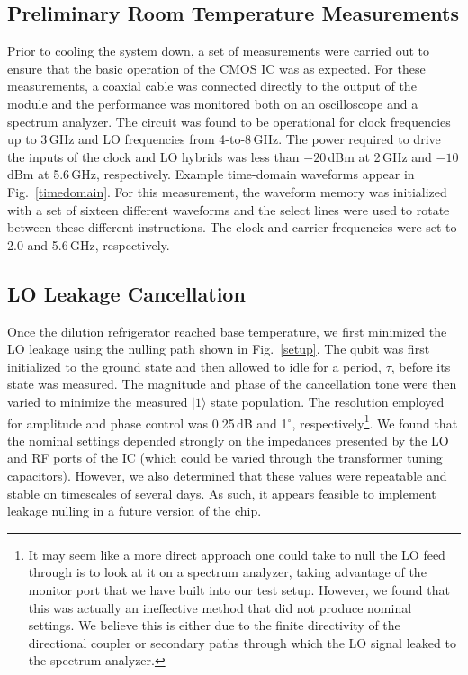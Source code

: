 \documentclass[journal]{IEEEtran}
\newcommand{\CR}[1]{{\color{black}#1}}
\begin{document}
\subsection{Preliminary Room Temperature Measurements}
Prior to cooling the system down, a set of measurements were carried out to ensure that the \CR{basic operation of the CMOS IC was as expected}. For these measurements, a coaxial cable was connected directly to the output of the module and the performance was monitored both on an oscilloscope and a spectrum analyzer.  %
\CR{The circuit was found to be operational for clock frequencies up to 3\,GHz and LO frequencies from 4-to-8\,GHz.} The power required to drive the inputs of the clock and LO hybrids was less than $-20\,$dBm at 2\,GHz and $-10\,$dBm at 5.6\,GHz, respectively.  Example time-domain waveforms appear in Fig.~\ref{timedomain}. For this measurement, the waveform memory was initialized with a set of sixteen different waveforms and the select lines were used to rotate between these different instructions. \CR{The clock and carrier frequencies were set to 2.0 and 5.6\,GHz, respectively}.

\subsection{LO Leakage Cancellation} %
Once the \CR{dilution refrigerator} reached base temperature, we first minimized the LO leakage using the \CR{nulling} path shown in Fig.~\ref{setup}.  The qubit was first initialized to the ground state and then allowed to idle for a period, $\tau$, before its state was measured. The magnitude and phase of the cancellation tone were then varied to minimize the measured $|1\rangle$ state population.  The resolution employed for amplitude and phase control was 0.25\,dB and 1$^\circ$, respectively\footnote{It may seem like a more direct approach one could take to null the LO feed through is to look at it on a spectrum analyzer, taking advantage of the monitor port that we have built into our test setup. However, we found that this was actually an ineffective method that did not produce nominal settings. We believe this is either due to the finite directivity of the directional coupler or secondary paths through which the LO signal leaked to the spectrum analyzer.}. We found that the nominal settings depended strongly on the impedances presented by the LO and RF ports of the IC (which could be varied through the transformer tuning capacitors). However, we also determined that these values were repeatable and stable on timescales of several days. As such, it appears feasible to implement leakage nulling in a future version of the chip.
\end{document}
